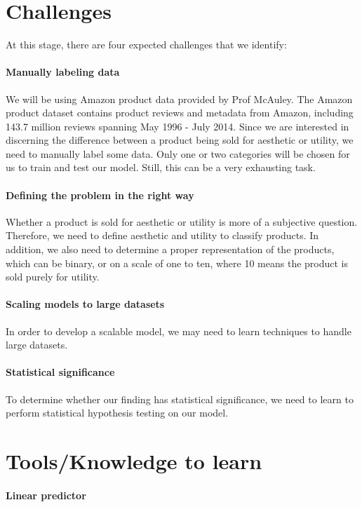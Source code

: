 \documentclass[dvips,12pt]{article}
\begin{document}
\section{Challenges}

At this stage, there are four expected challenges that we identify:

\paragraph{Manually labeling data}
We will be using Amazon product data provided by Prof McAuley. The Amazon product dataset contains product reviews and metadata from Amazon, including 143.7 million reviews spanning May 1996 - July 2014.\cite{Amazon} Since we are interested in discerning the difference between a product being sold for aesthetic or utility, we need to manually label some data. Only one or two categories will be chosen for us to train and test our model. Still, this can be a very exhausting task. 

\paragraph{Defining the problem in the right way}
Whether a product is sold for aesthetic or utility is more of a subjective question. Therefore, we need to define aesthetic and utility to classify products. In addition, we also need to determine a proper representation of the products, which can be binary, or on a scale of one to ten, where 10 means the product is sold purely for utility.

\paragraph{Scaling models to large datasets}
In order to develop a scalable model, we may need to learn techniques to handle large datasets.

\paragraph{Statistical significance}
To determine whether our finding has statistical significance, we need to learn to perform statistical hypothesis testing on our model.

\section{Tools/Knowledge to learn}

\paragraph{Linear predictor} 
\end{document}
